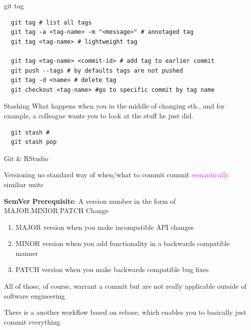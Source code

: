 \documentclass{beamer}
\begin{document}
\begin{frame}[fragile,t]{git tag}\vspace{10pt}
  \begin{lstlisting}
  git tag # list all tags
  git tag -a <tag-name> -m "<message>" # annotaged tag
  git tag <tag-name> # lightweight tag

  git tag <tag-name> <commit-id> # add tag to earlier commit
  git push --tags # by defaults tags are not pushed
  git tag -d <name> # delete tag
  git checkout <tag-name> #go to specific commit by tag name\end{lstlisting}
\end{frame}

\begin{frame}[fragile,t]{Stashing}\vspace{10pt}
  What happens when you in the middle of changing sth., and for example, a colleague wants you to look at the stuff he just did.
  \begin{lstlisting}
  git stash #
  git stash pop\end{lstlisting}
\end{frame}


\begin{frame}[fragile,t]{Git \& RStudio}\vspace{10pt}
\end{frame}

\begin{frame}[fragile,t]{Versioning}\vspace{10pt}
  no standard way of when/what to commit
  commit \textcolor{magenta}{semantically} similiar units\vspace{10pt}

  \textbf{SemVer}
  \textbf{Prerequisite}: A version number in the form of MAJOR.MINIOR.PATCH
  Change 
  \begin{enumerate}
      \item MAJOR version when you make incompatible API changes
      \item MINOR version when you add functionality in a backwards compatible manner
      \item PATCH version when you make backwards compatible bug fixes
  \end{enumerate}\vspace{10pt}
  All of those, of course, warrant a commit but are not really applicable outside of software engineering

  There is a another workflow based on rebase, which enables you to basically just commit everything%
\end{frame}
\end{document}
